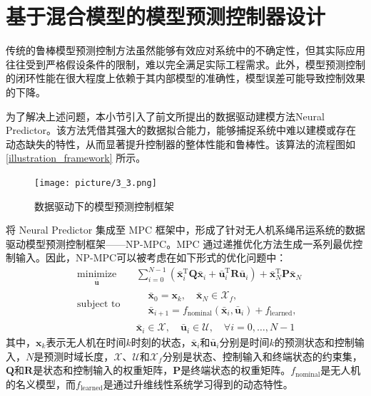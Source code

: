 \documentclass[lang=chs, degree=master, blindreview=false, winfonts=true]{yanputhesis}
\begin{document}
\section{基于混合模型的模型预测控制器设计}
传统的鲁棒模型预测控制方法虽然能够有效应对系统中的不确定性，但其实际应用往往受到严格假设条件的限制，难以完全满足实际工程需求。此外，模型预测控制的闭环性能在很大程度上依赖于其内部模型的准确性，模型误差可能导致控制效果的下降。

为了解决上述问题，本小节引入了前文所提出的数据驱动建模方法Neural Predictor。该方法凭借其强大的数据拟合能力，能够捕捉系统中难以建模或存在动态缺失的特性，从而显著提升控制器的整体性能和鲁棒性。该算法的流程图如\autoref{illustration_framework} 所示。

\begin{figure}[hbt!]
	\centering
	\texttt{[image: picture/3\_3.png]} 
	\caption{数据驱动下的模型预测控制框架} 
	\label{illustration_framework}
\end{figure}
将 Neural Predictor 集成至 MPC 框架中，形成了针对无人机系绳吊运系统的数据驱动模型预测控制框架——NP-MPC。MPC 通过递推优化方法生成一系列最优控制输入。因此，NP-MPC可以被考虑在如下形式的优化问题中：
\begin{equation}
	\begin{aligned} \label{nmpc}
		&\operatorname*{minimize}_{\bm{\bar{u}}}& & \sum_{i=0}^{N-1}\left(\bm{\bar{x}}_i^\mathrm{T}\bm{Q}\bm{\bar{x}}_i + \bm{\bar{u}}_i^\mathrm{T}\bm{R}\bm{\bar{u}}_i\right) + \bm{\bar{x}}_N^\mathrm{T}\bm{P}\bm{\bar{x}}_N  \\
		&\text{subject to}& & \begin{aligned}
			&\bm{\bar{x}}_{0} = \bm{x}_k, \quad \bm{\bar{x}}_{N} \in \mathcal{X}_f, \\
			&\bm{\bar{x}}_{i+1} = {f}_{\text{nominal}}(\bm{\bar{x}}_i, \bm{\bar{u}}_i) + {f}_{\text{learned}},
		\end{aligned} \\
		&&& \bm{\bar{x}}_i \in \mathcal{X}, \quad \bm{\bar{u}}_i \in \mathcal{U}, \quad \forall i = 0, \ldots, N-1
	\end{aligned}
\end{equation}
其中，$\bm{x}_k$表示无人机在时间$k$时刻的状态，$\bm{\bar{x}}_i$和$\bm{\bar{u}}_i$分别是时间$k$的预测状态和控制输入，$N$是预测时域长度，$\mathcal{X}$、$\mathcal{U}$和$\mathcal{X}_f$分别是状态、控制输入和终端状态的约束集，$\bm{Q}$和$\bm{R}$是状态和控制输入的权重矩阵，$\bm{P}$是终端状态的权重矩阵。${f}_{\text{nominal}}$是无人机的名义模型，而${f}_{\text{learned}}$是通过升维线性系统学习得到的动态特性。
\end{document}
